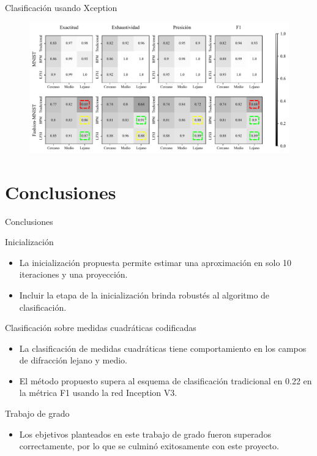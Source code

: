\documentclass[aspectratio=169,t,xcolor=table]{beamer}
\begin{document}
\begin{frame}{Clasificación usando Xception}
\scriptsize
    \begin{figure}
        \centering
        \includegraphics[width=\linewidth]{images/resultados/test_result_xception.pdf}
    \end{figure}
\end{frame}


\section{Conclusiones}
\begin{frame}{Conclusiones}
    \scriptsize
        \begin{block}{\scriptsize Inicialización}
        \begin{itemize}
            \item La inicialización propuesta permite estimar una aproximación en solo 10 iteraciones y una proyección.
            \item Incluir la etapa de la inicialización brinda robustés al algoritmo de clasificación.
        \end{itemize}
        \end{block}
        
        \begin{block}{\scriptsize Clasificación sobre medidas cuadráticas codificadas}
            \begin{itemize}
                \item La clasificación de medidas cuadráticas tiene comportamiento en los campos de difracción lejano y medio.
                \item El método propuesto supera al esquema de clasificación tradicional en 0.22 en la métrica F1 usando la red Inception V3.
            \end{itemize}        
        \end{block}


        \begin{block}{\scriptsize Trabajo de grado}
            \begin{itemize}
            \item Los ebjetivos planteados en este trabajo de grado fueron superados correctamente, por lo que se culminó exitosamente con este proyecto.
            \end{itemize}        
        \end{block}


\end{frame}
\end{document}
